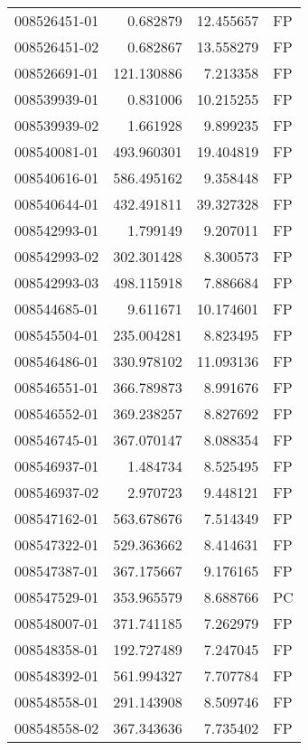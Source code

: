 \begin{tabular}{lrrl}
008526451-01 &    0.682879 &      12.455657 &   FP \\
008526451-02 &    0.682867 &      13.558279 &   FP \\
008526691-01 &  121.130886 &       7.213358 &   FP \\
008539939-01 &    0.831006 &      10.215255 &   FP \\
008539939-02 &    1.661928 &       9.899235 &   FP \\
008540081-01 &  493.960301 &      19.404819 &   FP \\
008540616-01 &  586.495162 &       9.358448 &   FP \\
008540644-01 &  432.491811 &      39.327328 &   FP \\
008542993-01 &    1.799149 &       9.207011 &   FP \\
008542993-02 &  302.301428 &       8.300573 &   FP \\
008542993-03 &  498.115918 &       7.886684 &   FP \\
008544685-01 &    9.611671 &      10.174601 &   FP \\
008545504-01 &  235.004281 &       8.823495 &   FP \\
008546486-01 &  330.978102 &      11.093136 &   FP \\
008546551-01 &  366.789873 &       8.991676 &   FP \\
008546552-01 &  369.238257 &       8.827692 &   FP \\
008546745-01 &  367.070147 &       8.088354 &   FP \\
008546937-01 &    1.484734 &       8.525495 &   FP \\
008546937-02 &    2.970723 &       9.448121 &   FP \\
008547162-01 &  563.678676 &       7.514349 &   FP \\
008547322-01 &  529.363662 &       8.414631 &   FP \\
008547387-01 &  367.175667 &       9.176165 &   FP \\
008547529-01 &  353.965579 &       8.688766 &   PC \\
008548007-01 &  371.741185 &       7.262979 &   FP \\
008548358-01 &  192.727489 &       7.247045 &   FP \\
008548392-01 &  561.994327 &       7.707784 &   FP \\
008548558-01 &  291.143908 &       8.509746 &   FP \\
008548558-02 &  367.343636 &       7.735402 &   FP \\

\end{tabular}
